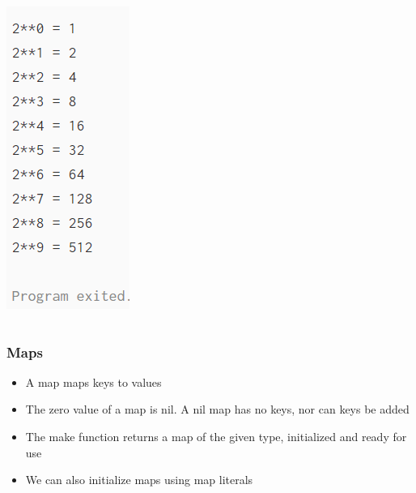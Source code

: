 \documentclass[14pt]{beamer}
\begin{document}
{\begin{frame}
\begin{columns}
\begin{column}{0.3\textwidth}
            \includegraphics[width=0.7\linewidth]{img/rangeoutput.PNG}
        \end{column}
    \end{columns}
\end{frame}
}

{
\begin{frame}
    \frametitle{Maps}
    \begin{itemize}
        \item A map maps keys to values
        \item The zero value of a map is nil. A nil map has no keys, nor can keys be added
        \item The make function returns a map of the given type, initialized and ready for use
        \item We can also initialize maps using map literals
    \end{itemize}
\end{frame}
}
\end{document}
